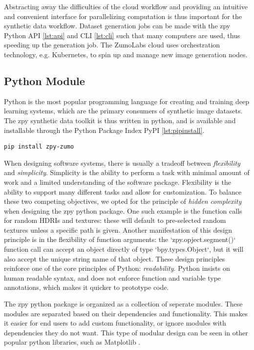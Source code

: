 \documentclass{article}
\begin{document}
Abstracting away the difficulties of the cloud workflow and providing an intuitive and convenient interface for parallelizing computation is thus important for the synthetic data workflow. Dataset generation jobs can be made with the zpy Python API \ref{lst:api} and CLI \ref{lst:cli} such that many computers are used, thus speeding up the generation job. The ZumoLabs cloud uses orchestration technology, e.g. Kubernetes, to spin up and manage new image generation nodes.

\subsection{Python Module}
\label{sec:pythonmodule}

Python is the most popular programming language for creating and training deep learning systems, which are the primary consumers of synthetic image datasets. The zpy synthetic data toolkit is thus written in python, and is available and installable through the Python Package Index PyPI \ref{lst:pipinstall}.

\begin{lstlisting}[language=bash,caption={Installing the zpy python module.},label={lst:pipinstall}]
pip install zpy-zumo
\end{lstlisting}

When designing software systems, there is usually a tradeoff between \emph{flexibility} and \emph{simplicity}. Simplicity is the ability to perform a task with minimal amount of work and a limited understanding of the software package. Flexibility is the ability to support many different tasks and allow for customization. To balance these two competing objectives, we opted for the principle of \emph{hidden complexity} when designing the zpy python package. One such example is the function calls for random HDRIs and textures: these will default to pre-selected random textures unless a specific path is given. Another manifestation of this design principle is in the flexibility of function arguments: the `zpy.opject.segment()` function call can accept an object directly of type `bpy.types.Object`, but it will also accept the unique string name of that object. These design principles reinforce one of the core principles of Python: \emph{readability}. Python insists on human readable syntax, and does not enforce function and variable type annotations, which makes it quicker to prototype code.


The zpy python package is organized as a collection of seperate modules. These modules are separated based on their dependencies and functionality. This makes it easier for end users to add custom functionality, or ignore modules with dependencies they do not want. This type of modular design can be seen in other popular python libraries, such as Matplotlib \cite{Hunter:2007}.
\end{document}
